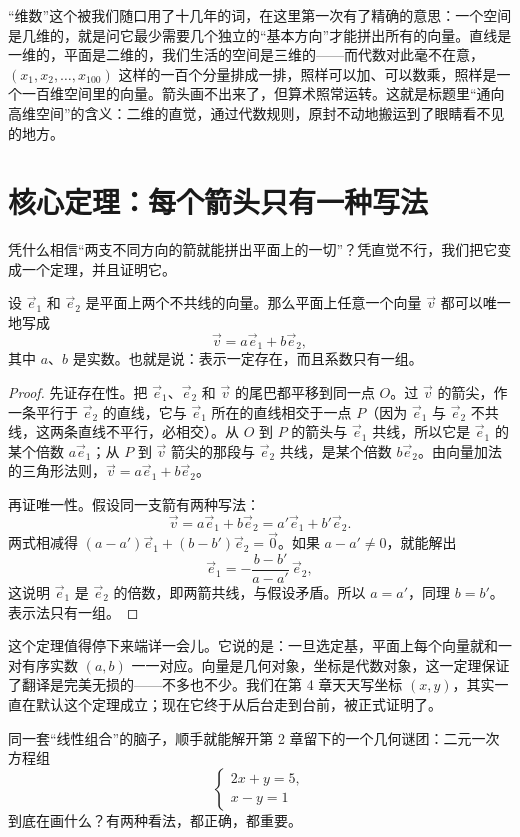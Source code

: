 “维数”这个被我们随口用了十几年的词，在这里第一次有了精确的意思：一个空间是几维的，就是问它最少需要几个独立的“基本方向”才能拼出所有的向量。直线是一维的，平面是二维的，我们生活的空间是三维的——而代数对此毫不在意，$(x_1,x_2,\dots,x_{100})$ 这样的一百个分量排成一排，照样可以加、可以数乘，照样是一个一百维空间里的向量。箭头画不出来了，但算术照常运转。这就是标题里“通向高维空间”的含义：二维的直觉，通过代数规则，原封不动地搬运到了眼睛看不见的地方。

\section{核心定理：每个箭头只有一种写法}

凭什么相信“两支不同方向的箭就能拼出平面上的一切”？凭直觉不行，我们把它变成一个定理，并且证明它。

\begin{dingli}[坐标的唯一性]
设 $\vec{e}_1$ 和 $\vec{e}_2$ 是平面上两个不共线的向量。那么平面上任意一个向量 $\vec{v}$ 都可以唯一地写成
\[
\vec{v}=a\vec{e}_1+b\vec{e}_2,
\]
其中 $a$、$b$ 是实数。也就是说：表示一定存在，而且系数只有一组。
\end{dingli}

\begin{proof}
先证存在性。把 $\vec{e}_1$、$\vec{e}_2$ 和 $\vec{v}$ 的尾巴都平移到同一点 $O$。过 $\vec{v}$ 的箭尖，作一条平行于 $\vec{e}_2$ 的直线，它与 $\vec{e}_1$ 所在的直线相交于一点 $P$（因为 $\vec{e}_1$ 与 $\vec{e}_2$ 不共线，这两条直线不平行，必相交）。从 $O$ 到 $P$ 的箭头与 $\vec{e}_1$ 共线，所以它是 $\vec{e}_1$ 的某个倍数 $a\vec{e}_1$；从 $P$ 到 $\vec{v}$ 箭尖的那段与 $\vec{e}_2$ 共线，是某个倍数 $b\vec{e}_2$。由向量加法的三角形法则，$\vec{v}=a\vec{e}_1+b\vec{e}_2$。

再证唯一性。假设同一支箭有两种写法：
\[
\vec{v}=a\vec{e}_1+b\vec{e}_2=a'\vec{e}_1+b'\vec{e}_2.
\]
两式相减得 $(a-a')\vec{e}_1+(b-b')\vec{e}_2=\vec{0}$。如果 $a-a'\neq 0$，就能解出
\[
\vec{e}_1=-\frac{b-b'}{a-a'}\,\vec{e}_2,
\]
这说明 $\vec{e}_1$ 是 $\vec{e}_2$ 的倍数，即两箭共线，与假设矛盾。所以 $a=a'$，同理 $b=b'$。表示法只有一组。
\end{proof}

这个定理值得停下来端详一会儿。它说的是：一旦选定基，平面上每个向量就和一对有序实数 $(a,b)$ 一一对应。向量是几何对象，坐标是代数对象，这一定理保证了翻译是完美无损的——不多也不少。我们在第 4 章天天写坐标 $(x,y)$，其实一直在默认这个定理成立；现在它终于从后台走到台前，被正式证明了。

同一套“线性组合”的脑子，顺手就能解开第 2 章留下的一个几何谜团：二元一次方程组
\[
\begin{cases}
2x+y=5,\\
x-y=1
\end{cases}
\]
到底在画什么？有两种看法，都正确，都重要。

